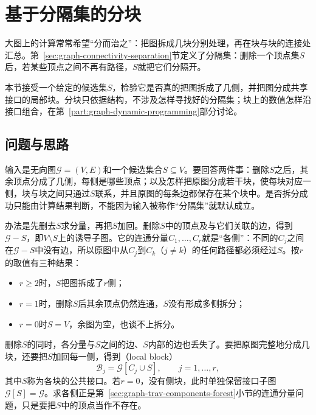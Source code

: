 \section{基于分隔集的分块}
\label{sec:graph-separator-blocks}

大图上的计算常常希望“分而治之”：把图拆成几块分别处理，再在块与块的连接处汇总。第~\ref{sec:graph-connectivity-separation}节定义了分隔集：删除一个顶点集$S$后，若某些顶点之间不再有路径，$S$就把它们分隔开。

本节接受一个给定的候选集$S$，检验它是否真的把图拆成了几侧，并把图分成共享接口的局部块。分块只依据结构，不涉及怎样寻找好的分隔集；块上的数值怎样沿接口组合，在第~\ref{part:graph-dynamic-programming}部分讨论。

\subsection{问题与思路}
\label{sec:graph-trav-delete-separator}

输入是无向图$\mathcal G=(V,E)$和一个候选集合$S\subseteq V$。要回答两件事：删除$S$之后，其余顶点分成了几侧，每侧是哪些顶点；以及怎样把原图分成若干块，使每块对应一侧，块与块之间只通过$S$联系，并且原图的每条边都保存在某个块中。是否拆分成功只能由计算结果判断，不能因为输入被称作“分隔集”就默认成立。

办法是先删去$S$求分量，再把$S$加回。删除$S$中的顶点及与它们关联的边，得到$\mathcal G-S$，即$V\setminus S$上的诱导子图。它的连通分量$C_1,\ldots,C_r$就是“各侧”：不同的$C_j$之间在$\mathcal G-S$中没有边，所以原图中从$C_j$到$C_k$（$j\neq k$）的任何路径都必须经过$S$。按$r$的取值有三种结果：
\begin{itemize}
  \item $r\geq2$时，$S$把图拆成了$r$侧；
  \item $r=1$时，删除$S$后其余顶点仍然连通，$S$没有形成多侧拆分；
  \item $r=0$时$S=V$，余图为空，也谈不上拆分。
\end{itemize}

删除$S$的同时，各分量与$S$之间的边、$S$内部的边也丢失了。要把原图完整地分成几块，还要把$S$加回每一侧，得到（local block）
\begin{equation}
\mathcal B_j=\mathcal G[C_j\cup S],\qquad j=1,\ldots,r,
\label{eq:graph-trav-local-block}
\end{equation}
其中$S$称为各块的公共接口。若$r=0$，没有侧块，此时单独保留接口子图$\mathcal G[S]=\mathcal G$。求各侧正是第~\ref{sec:graph-trav-components-forest}小节的连通分量问题，只是要把$S$中的顶点当作不存在。

